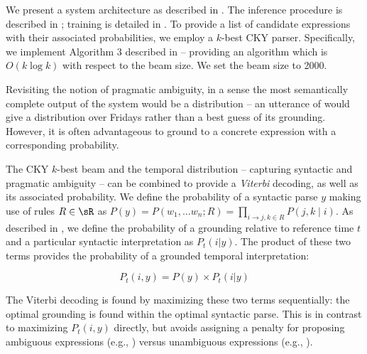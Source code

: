 We present a system architecture as described in .
The inference procedure is described in ;
	training is detailed in .
To provide a list of
	candidate expressions with their associated probabilities, we
	employ a $k$-best CKY parser.
Specifically, we implement Algorithm 3 described in 
	 -- providing an algorithm which is
	$O(k\log k)$ with respect to the beam size.
We set the beam size to 2000.

Revisiting the notion of pragmatic ambiguity,
	in a sense the most semantically complete output of the system would be
	a distribution -- 
	an utterance of  would give a distribution over Fridays
	rather than a best guess of its grounding.
However, it is often advantageous to ground to a concrete expression with a
	corresponding probability.

The CKY $k$-best beam and the temporal distribution 
	-- capturing syntactic and pragmatic ambiguity --
	can be combined to provide a \textit{Viterbi} decoding, as well as
	its associated probability.
We define the probability of a syntactic parse $y$ making use of rules 
	$R \in \sR$ as
	$P(y) = P(w_1,\dots w_n; R) = \prod_{i \rightarrow j,k \in R}P(j,k \mid i)$.
	As described in , we define the probability of a 
	grounding relative to reference time $t$ and a particular
	syntactic interpretation as $P_t(i | y)$.
The product of these two terms provides the probability of a grounded temporal
	interpretation:

\begin{equation}
	P_t(i, y) = 
		P( y ) \times P_t(i | y)
\label{eqn:prob}
\end{equation}

The Viterbi decoding is found by maximizing these two terms sequentially:
	the optimal grounding is found within the optimal syntactic parse.
This is in contrast to maximizing $P_t(i,y)$ directly, but avoids
	assigning a penalty for proposing ambiguous expressions (e.g., )
	versus unambiguous expressions (e.g., ).

